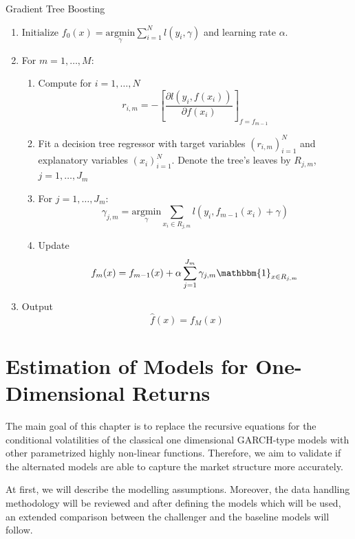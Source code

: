 \documentclass[a4paper, oneside]{discothesis}
\begin{document}
\begin{algorithm}\label{gb_alg}
\caption{Gradient Tree Boosting}
\begin{algorithmic}
\State \begin{enumerate} 

\item $\text{Initialize } f_0(x) = \underset{\gamma}{\mathrm{argmin }} \sum_{i=1}^N l(y_i, \gamma)$ and learning rate $\alpha$.
\item For $m = 1, \dots, M$:

\begin{enumerate}
\item Compute for $i = 1, \dots, N$\[r_{i,m} = - \left[\frac{\partial l\left(y_i, f(x_i)\right)}{\partial f(x_i)}\right]_{f = f_{m-1}}\]

\item Fit a decision tree regressor with target variables $(r_{i,m})_{i=1}^N$ and explanatory variables $(x_i)_{i=1}^N$. Denote the tree's leaves by $R_{j, m}$, $j = 1, \dots, J_m$

\item For $j = 1,\dots, J_m$:
\[ \gamma_{j,m} = \underset{\gamma}{\mathrm{argmin }}\underset{x_i\in R_{j,m}}{\sum}l(y_i, f_{m-1}(x_i)+\gamma)\]
\item Update \[f_m(x) = f_{m-1}(x)+\alpha \sum_{j=1}^{J_m}\gamma_{j,m} \mathbbm{1}_{x\in R_{j,m}}\]

\end{enumerate}
\item Output \[\hat{f}(x) = f_M(x)\]

\end{enumerate} 
\end{algorithmic}
\end{algorithm}

\chapter{Estimation of Models for One-Dimensional Returns}

The main goal of this chapter is to replace the recursive equations for the conditional volatilities of the classical one dimensional GARCH-type models with other parametrized highly non-linear functions. Therefore, we aim to validate if the alternated models are able to capture the market structure more accurately. 

At first, we will describe the modelling assumptions. Moreover, the data handling methodology will be reviewed and after defining the models which will be used, an extended comparison between the challenger and the baseline models will follow. 
\end{document}
